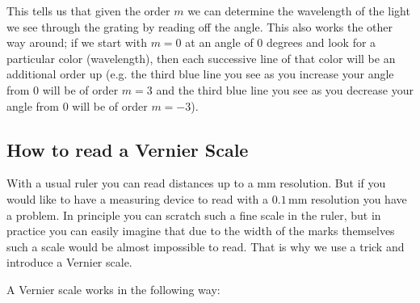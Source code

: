 This tells us that given the order $m$ we can determine the wavelength of the light we see through the grating by reading off the angle. This also works the other way around; if we start with $m = 0$ at an angle of $0$ degrees and look for a particular color (wavelength), then each successive line of that color will be an additional order up (e.g. the third blue line you see as you increase your angle from 0 will be of order $m=3$ and  the third blue line you see as you decrease your angle from 0  will be of order $m=-3$).

\subsection{How to read a Vernier Scale}
With a usual ruler you can read distances up to a mm resolution. But if you would like to have a measuring device to read with a $0.1\, \mathrm{mm}$ resolution you have a problem. In principle you can scratch such a fine scale in the ruler, but in practice you can easily imagine that due to the width of the marks themselves such a scale would be almost impossible to read. That is why we use a trick and introduce a Vernier scale.\myskip

A Vernier scale works in the following way:


